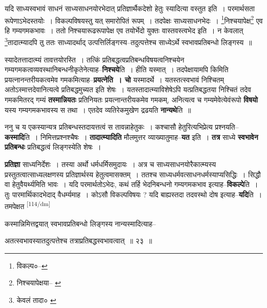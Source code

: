 \documentclass[article,12pt,a4paper]{memoir}
\begin{document}
	  \pstart यदि साध्यस्वभावं साधनं साध्यसाधनयोरभेदात् प्रतिज्ञार्थैकदेशो हेतुः स्यादित्या वस्तुत इति । परमार्थसता रूपेणाऽभेदस्तयोः । विकल्पविषयस्तु यत् समारोपितं रूपम् । तदपेक्षः साध्यसाधनभेदः । \footnote{विकल्प०--\cite{dp-msD-n}}निश्चयापेक्ष\footnote{निश्चयापेक्षया--\cite{dp-msB} \cite{dp-msC} \cite{dp-msD}} एव हि गम्यगमकभावः । ततो निश्चयारूढरूपापेक्ष एव तयोर्भेदो युक्तः वास्तवस्त्वभेद इति । न केवलात् \footnote{केवलं तादा० \cite{dp-msA} \cite{dp-msB} \cite{dp-msD} \cite{dp-edP} \cite{dp-edH} \cite{dp-edE} \cite{dp-edN}}तादात्म्यादपि तु ततः साध्यादर्थाद् उत्पत्तिर्लिङ्गस्य--तदुत्पत्तेश्च साध्येऽर्थे स्वभावप्रतिबन्धो लिङ्गस्य ॥
	\pend
      

	  \pstart स्यादेतत्तादात्म्यं तावत्तयोरस्ति । तत्किं प्रतिबद्धत्वप्रतिबन्धविषयत्वनिश्चयेन गम्यगमकत्वव्यवस्थानिबन्धनीकृतेनेत्याह--\textbf{निश्चये}ति । हीति यस्मात् । तदपेक्षायामपि किमिति प्रयत्नानन्तरीयकत्वमेव गमकमित्याह--\textbf{प्रयत्नेति । चो} यस्मादर्थे । यतस्तत्स्वभावं निश्चितम् अतोऽस्मात्तदेवानित्यत्वे प्रतिबद्धमुच्यत इति शेषः । यतस्तादात्म्याविशेषेऽपि यत्प्रतिबद्धतया निश्चितं तदेव गमकमितरद् गम्यं \textbf{तस्मान्नियतः} प्रतिनियतः प्रयत्नान्तरीयकमेव गमकम्, अनित्यत्व च गम्यमेवेत्येवंरूपो \textbf{विषयो} यस्य गम्यगमकभावस्य स तथा । एतदेव व्यतिरेकमुखेण द्रढयति \textbf{नान्यथे}ति ॥
	\pend
      

	  \pstart ननु च य एकस्यान्यत्र प्रतिबन्धस्तदायत्तत्वं स तावन्नाहेतुकः । कश्चासौ हेतुरित्यभिप्रेत्य प्रश्नयति--\textbf{कस्मादि}ति । निमित्तप्रश्नश्चैषः । \textbf{तादात्म्यादिति} मौलमुत्तर व्याख्यातुमाह--\textbf{यत} इति । \textbf{तत्र} साध्ये \textbf{स्वभावेन प्रतिबन्धः} प्रतिबद्धत्वं लिङ्गस्येति शेषः ।
	\pend
      

	  \pstart \textbf{प्रतिज्ञा} साध्यनिर्देशः । तस्या अर्थो धर्मधर्मिसमुदायः । अत्र च साध्यसाधनयोरैकात्म्यस्य प्रस्तुतत्वात्साध्यलक्षणस्य प्रतिज्ञार्थस्य हेतुत्वमासक्तम् । ततश्च साध्यधर्मवत्साधनधर्मस्याप्यसिद्धिः । सिद्धौ वा हेतुवैयर्थ्यमिति भावः । यदि परमार्थतोऽभेदः, कथं तर्हि भेदनिबन्धनो गम्यगमकभाव इत्याह--\textbf{विकल्पे}ति । तुः पारमार्थिकादभेदाद् वैधर्म्यमाह । कोऽसौ विकल्पविषयः ? यदि बाह्यस्तदा तदवस्थो दोष इत्याह--\textbf{यदि}ति । तमपेक्षत  \leavevmode\textsuperscript{\rmlatinfont\tiny [114/dm]} 
	  
	कस्मान्निमित्तद्वयात् स्वभावप्रतिबन्धो लिङ्गस्य नान्यस्मादित्याह-- 
	  
	अतत्स्वभावस्यातदुत्पत्तेश्च तत्राप्रतिबद्धस्वभावत्वात् ॥ २३ ॥ 
	  
\end{document}
